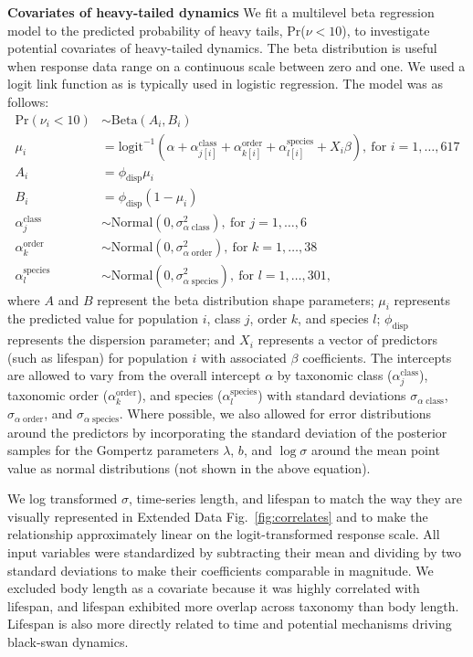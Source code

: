 \textbf{Covariates of heavy-tailed dynamics} We fit a multilevel beta regression model to the predicted probability of heavy tails, Pr(\(\nu < 10\)), to investigate potential covariates of heavy-tailed dynamics. The beta distribution is useful when response data range on a continuous scale between zero and one\cite{ferrari2004}. We used a logit link function as is typically used in logistic regression. The model was as follows:
\begin{align}
\mathrm{Pr}(\nu_i < 10) &\sim \mathrm{Beta}(A_i, B_i)\\
\mu_i &= \mathrm{logit}^{-1}(\alpha
  + \alpha^\mathrm{class}_{j[i]}
  + \alpha^\mathrm{order}_{k[i]}
  + \alpha^\mathrm{species}_{l[i]}
  + X_i \beta),
  \: \text{for } i = 1, \dots, 617\\
A_i &= \phi_\mathrm{disp} \mu_i\\
B_i &= \phi_\mathrm{disp} (1 - \mu_i)\\
\alpha^\mathrm{class}_j &\sim
  \mathrm{Normal}(0, \sigma^2_{\alpha \; \mathrm{class}}),
  \: \text{for } j = 1, \dots, 6\\
\alpha^\mathrm{order}_k &\sim
  \mathrm{Normal}(0, \sigma^2_{\alpha \; \mathrm{order}}),
  \: \text{for } k = 1, \dots, 38\\
\alpha^\mathrm{species}_l &\sim
  \mathrm{Normal}(0, \sigma^2_{\alpha \; \mathrm{species}}),
  \: \text{for } l = 1, \dots, 301,
\end{align}
where \(A\) and \(B\) represent the beta distribution shape parameters; \(\mu_i\) represents the predicted value for population \(i\), class \(j\), order \(k\), and species \(l\); \(\phi_\mathrm{disp}\) represents the dispersion parameter; and \(X_i\) represents a vector of predictors (such as lifespan) for population \(i\) with associated \(\beta\) coefficients. The intercepts are allowed to vary from the overall intercept \(\alpha\) by taxonomic class (\(\alpha^\mathrm{class}_j\)), taxonomic order (\(\alpha^\mathrm{order}_k\)), and species (\(\alpha^\mathrm{species}_l\)) with standard deviations \(\sigma_{\alpha \;  \mathrm{class}}\), \(\sigma_{\alpha \; \mathrm{order}}\), and \(\sigma_{\alpha  \; \mathrm{species}}\). Where possible, we also allowed for error distributions around the predictors by incorporating the standard deviation of the posterior samples for the Gompertz parameters \(\lambda\), \(b\), and \(\log \sigma\) around the mean point value as normal distributions (not shown in the above equation).

We log transformed \(\sigma\), time-series length, and lifespan to match the way they are visually represented in Extended Data Fig.~\ref{fig:correlates} and to make the relationship approximately linear on the logit-transformed response scale. All input variables were standardized by subtracting their mean and dividing by two standard deviations to make their coefficients comparable in magnitude\cite{gelman2008c}. We excluded body length as a covariate because it was highly correlated with lifespan, and lifespan exhibited more overlap across taxonomy than body length. Lifespan is also more directly related to time and potential mechanisms driving black-swan dynamics.

